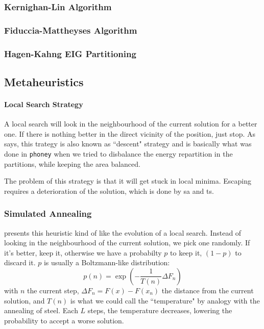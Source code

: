 \documentclass[12pt,a4paper]{article}
\theoremstyle{customdef}
\begin{document}
\subsubsection{Kernighan-Lin Algorithm}

\subsubsection{Fiduccia-Mattheyses Algorithm}

\subsubsection{Hagen-Kahng EIG Partitioning}

\subsection{Metaheuristics}

\paragraph{Local Search Strategy}
A local search will look in the neighbourhood of the current solution for a better one.
If there is nothing better in the direct vicinity of the position, just stop.
As \cite{Pirlot1996} says, this trategy is also known as ``descent" strategy and is basically what was done in \texttt{phoney} when we tried to disbalance the energy repartition in the partitions, while keeping the area balanced.

The problem of this strategy is that it will get stuck in local minima.
Escaping requires a deterioration of the solution, which is done by \gls{sa} and \gls{ts}.

\subsubsection{Simulated Annealing}
\cite{Pirlot1996} presents this heuristic kind of like the evolution of a local search.
Instead of looking in the neighbourhood of the current solution, we pick one randomly.
If it's better, keep it, otherwise we have a probabilty $p$ to keep it, $(1-p)$ to discard it.
$p$ is usually a Boltzmann-like distribution:
\[p(n) = \exp{\left(-\frac{1}{T(n)} \Delta F_n\right)}\]
with $n$ the current step, $\Delta F_n = F(x) - F(x_n)$ the distance from the current solution, and $T(n)$ is what we could call the ``temperature" by analogy with the annealing of steel.
Each $L$ steps, the temperature decreases, lowering the probability to accept a worse solution.
\end{document}
